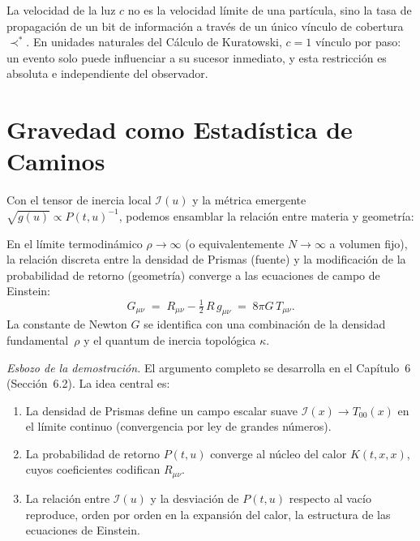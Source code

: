 \documentclass[11pt, a4paper, openany]{book}
\newcommand{\covers}{\prec^{\!*}}
\begin{document}
\begin{result}[title={La Velocidad de la Luz como Bit Causal}]
\label{res:speed-of-light}
La velocidad de la luz $c$ no es la velocidad l\'imite de una
part\'icula, sino la tasa de propagaci\'on de un bit de
informaci\'on a trav\'es de un \'unico v\'inculo de cobertura
$\covers$. En unidades naturales del C\'alculo de
Kuratowski, $c = 1$ v\'inculo por paso: un evento solo puede
influenciar a su sucesor inmediato, y esta restricci\'on es absoluta
e independiente del observador.
\end{result}

\section{Gravedad como Estad\'istica de Caminos}

Con el tensor de inercia local $\mathcal{I}(u)$ y la m\'etrica
emergente $\sqrt{g(u)} \propto P(t,u)^{-1}$, podemos ensamblar la
relaci\'on entre materia y geometr\'ia:

\begin{theorem}
\label{thm:einstein-statistical}
En el l\'imite termodin\'amico $\rho \to \infty$ (o equivalentemente
$N \to \infty$ a volumen fijo), la relaci\'on discreta entre la
densidad de Prismas (fuente) y la modificaci\'on de la probabilidad de
retorno (geometr\'ia) converge a las ecuaciones de campo de Einstein:
\begin{equation}
  \boxed{\;
  G_{\mu\nu}
  \;=\; R_{\mu\nu} - \tfrac{1}{2}\,R\,g_{\mu\nu}
  \;=\; 8\pi G\, T_{\mu\nu}.
  \;}
  \label{eq:einstein-limit}
\end{equation}
La constante de Newton $G$ se identifica con una combinaci\'on de la
densidad fundamental~$\rho$ y el quantum de inercia topol\'ogica
$\kappa$.
\end{theorem}

\noindent
\textit{Esbozo de la demostraci\'on.}
El argumento completo se desarrolla en el Cap\'itulo~6
(Secci\'on~6.2). La idea central es:
\begin{enumerate}
  \item La densidad de Prismas define un campo escalar suave
    $\mathcal{I}(x) \to T_{00}(x)$ en el l\'imite continuo
    (convergencia por ley de grandes n\'umeros).
  \item La probabilidad de retorno $P(t, u)$ converge al n\'ucleo del
    calor $K(t, x, x)$, cuyos coeficientes codifican $R_{\mu\nu}$.
  \item La relaci\'on entre $\mathcal{I}(u)$ y la desviaci\'on de
    $P(t,u)$ respecto al vac\'io reproduce, orden por orden en la
    expansi\'on del calor, la estructura de las ecuaciones de
    Einstein.
\end{enumerate}
\end{document}
